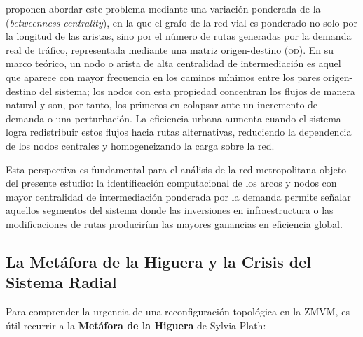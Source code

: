 \cite{batista2015} proponen abordar este problema mediante una variación
ponderada de la  (\textit{betweenness
centrality}), en la que el grafo de la red vial es ponderado no solo por la longitud de
las aristas, sino por el número de rutas generadas por la demanda real de tráfico,
representada mediante una matriz origen-destino (\textsc{od}). En su marco teórico,
un nodo o arista de alta centralidad de intermediación es aquel que aparece con mayor
frecuencia en los caminos mínimos entre los pares origen-destino del sistema; los
nodos con esta propiedad concentran los flujos de manera natural y son, por tanto,
los primeros en colapsar ante un incremento de demanda o una perturbación. La
eficiencia urbana aumenta cuando el sistema logra redistribuir estos flujos hacia rutas
alternativas, reduciendo la dependencia de los nodos centrales y homogeneizando
la carga sobre la red.
 
Esta perspectiva es fundamental para el análisis de la red metropolitana objeto del
presente estudio: la identificación computacional de los arcos y nodos con mayor
centralidad de intermediación ponderada por la demanda permite señalar aquellos
segmentos del sistema donde las inversiones en infraestructura o las modificaciones
de rutas producirían las mayores ganancias en eficiencia global.

\subsection{La Metáfora de la Higuera y la Crisis del Sistema Radial}
\label{subsubsec:metafora-crisis}

Para comprender la urgencia de una reconfiguración topológica en la ZMVM, es útil recurrir a 
la \textbf{Metáfora de la Higuera} de Sylvia Plath: 


